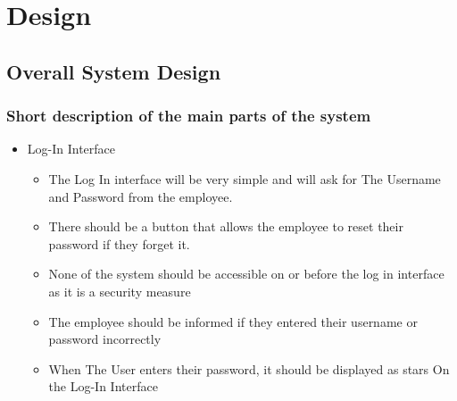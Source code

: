 \chapter{Design}

\section{Overall System Design}

\subsection{Short description of the main parts of the system}

\begin{itemize}
	\item Log-In Interface
	\begin{itemize}
		\item The Log In interface will be very simple and will ask for The Username and Password from the employee.
		\item There should be a button that allows the employee to reset their password if they forget it.
		\item None of the system should be accessible on or before the log in interface as it is a security measure
		\item The employee should be informed if they entered their username or password incorrectly
		\item When The User enters their password, it should be displayed as stars On the Log-In Interface
	\end{itemize}


\end{itemize}
